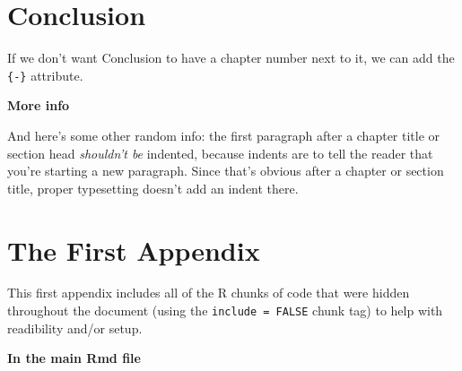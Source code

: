 \documentclass[12pt,twoside]{reedthesis}
\begin{document}
  \chapter*{Conclusion}\label{conclusion}
  
  If we don't want Conclusion to have a chapter number next to it, we can
  add the \texttt{\{-\}} attribute.
  
  \textbf{More info}
  
  And here's some other random info: the first paragraph after a chapter
  title or section head \emph{shouldn't be} indented, because indents are
  to tell the reader that you're starting a new paragraph. Since that's
  obvious after a chapter or section title, proper typesetting doesn't add
  an indent there.
  
  \appendix
  
  \chapter{The First Appendix}\label{the-first-appendix}
  
  This first appendix includes all of the R chunks of code that were
  hidden throughout the document (using the \texttt{include\ =\ FALSE}
  chunk tag) to help with readibility and/or setup.
  
  \textbf{In the main Rmd file}
  
\end{document}
